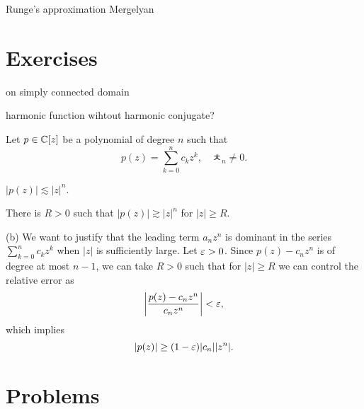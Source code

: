 \documentclass{../../large}
\begin{document}
Runge's approximation
Mergelyan





\section*{Exercises}
\begin{prb}
\end{prb}
\begin{prb}
on simply connected domain
\end{prb}
\begin{prb}
harmonic function wihtout harmonic conjugate?
\end{prb}

\begin{prb}
Let $p\in\mathbb{C}[z]$ be a polynomial of degree $n$ such that
\[p(z)=\sum_{k=0}^nc_kz^k,\quad ㅊ_n\ne0.\]
\begin{parts}
\item $|p(z)|\lesssim|z|^n$.
\item There is $R>0$ such that $|p(z)|\gtrsim|z|^n$ for $|z|\ge R$.
\end{parts}
\end{prb}
\begin{pf}
(b)
We want to justify that the leading term $a_nz^n$ is dominant in the series $\sum_{k=0}^nc_kz^k$ when $|z|$ is sufficiently large.
Let $\varepsilon>0$.
Since $p(z)-c_nz^n$ is of degree at most $n-1$, we can take $R>0$ such that for $|z|\ge R$ we can control the relative error as
\[\left|\frac{p(z)-c_nz^n}{c_nz^n}\right|<\varepsilon,\]
which implies
\[|p(z)|\ge(1-\varepsilon)|c_n||z^n|.\]
\end{pf}





\section*{Problems}
\end{document}
